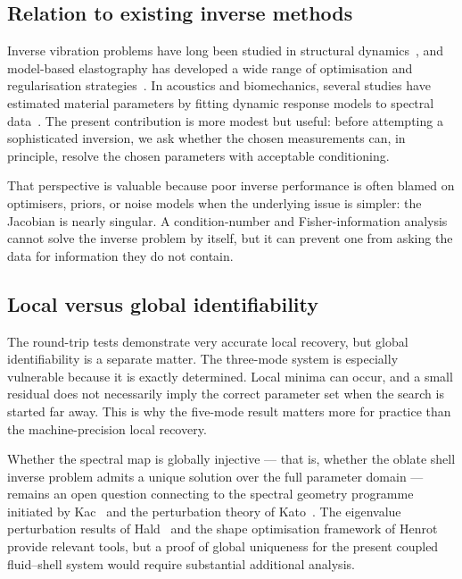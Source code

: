 \subsection{Relation to existing inverse methods}

Inverse vibration problems have long been studied in structural
dynamics~\cite{Gladwell2004,Gladwell2005}, and model-based elastography has
developed a wide range of optimisation and regularisation
strategies~\cite{Doyley2012}.  In acoustics and biomechanics, several studies
have estimated material parameters by fitting dynamic response models to
spectral data~\cite{Aernouts2012}.  The present contribution is more modest but
useful: before attempting a sophisticated inversion, we ask whether the chosen
measurements can, in principle, resolve the chosen parameters with acceptable
conditioning.

That perspective is valuable because poor inverse performance is often blamed on
optimisers, priors, or noise models when the underlying issue is simpler: the
Jacobian is nearly singular.  A condition-number and Fisher-information analysis
cannot solve the inverse problem by itself, but it can prevent one from asking
the data for information they do not contain.

\subsection{Local versus global identifiability}

The round-trip tests demonstrate very accurate local recovery, but global
identifiability is a separate matter.  The three-mode system is especially
vulnerable because it is exactly determined.  Local minima can occur, and a
small residual does not necessarily imply the correct parameter set when the
search is started far away.  This is why the five-mode result matters more for
practice than the machine-precision local recovery.

Whether the spectral map is globally injective --- that is, whether the oblate
shell inverse problem admits a unique solution over the full parameter domain
--- remains an open question connecting to the spectral geometry programme
initiated by Kac~\cite{Kac1966} and the perturbation theory of
Kato~\cite{Kato1966}.  The eigenvalue perturbation results of
Hald~\cite{Hald1978,Hald1984CPAM} and the shape optimisation framework of
Henrot~\cite{Henrot2006} provide relevant tools, but a proof of global
uniqueness for the present coupled fluid--shell system would require substantial
additional analysis.

